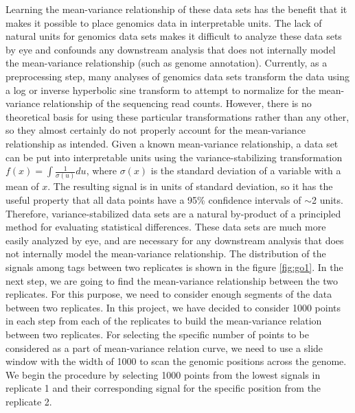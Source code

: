 \documentclass[11pt,letterpaper]{article}
\begin{document}
Learning the mean-variance relationship of these data sets has the benefit that it makes it possible to place genomics data in interpretable units. The lack of natural units for genomics data sets makes it difficult to analyze these data sets by eye and confounds any downstream analysis that does not internally model the mean-variance relationship (such as genome annotation). Currently, as a preprocessing step, many analyses of genomics data sets transform the data using a log or inverse hyperbolic sine transform to attempt to normalize for the mean-variance relationship of the sequencing read counts. However, there is no theoretical basis for using these particular transformations rather than any other, so they almost certainly do not properly account for the mean-variance relationship as intended. Given a known mean-variance relationship, a data set can be put into interpretable units using the variance-stabilizing transformation $f(x) = \int \frac 1 {\sigma(u)} du$, where $\sigma(x)$ is the standard deviation of a variable with a mean of $x$. The resulting signal is in units of standard deviation, so it has the useful property that all data points have a 95\% confidence intervals of $\sim$2 units. Therefore, variance-stabilized data sets are a natural by-product of a principled method for evaluating statistical differences. These data sets are much more easily analyzed by eye, and are necessary for any downstream analysis that does not internally model the mean-variance relationship.
The distribution of the signals among tags between two replicates is shown in the figure \ref{fig:go1}.
%		
In the next step, we are going to find the mean-variance relationship between the two replicates.
For this purpose, we need to consider enough segments of the data between two replicates. In this project, we have decided to consider 1000 points in each step from each of the replicates to build the mean-variance relation between two replicates.
For selecting the specific number of points to be considered as a part of mean-variance relation curve, we need to use a slide window with the width of 1000 to scan the genomic positions across the genome. We begin the procedure by selecting 1000 points from the lowest signals in replicate 1 and their corresponding signal for the specific position from the replicate 2.
\end{document}
